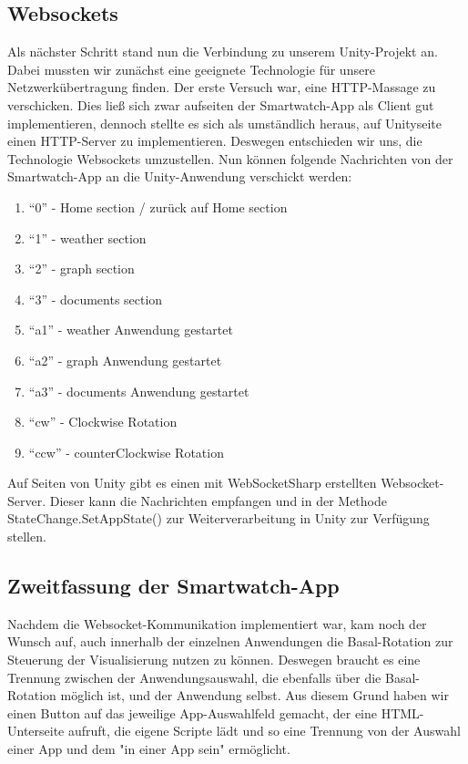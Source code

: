 \documentclass[12pt, a4paper]{article}
\begin{document}
\subsection{Websockets}

Als nächster Schritt stand nun die Verbindung zu unserem Unity-Projekt an. Dabei mussten wir zunächst eine geeignete Technologie für unsere Netzwerkübertragung finden. Der erste Versuch war, eine HTTP-Massage zu verschicken. Dies ließ sich zwar aufseiten der Smartwatch-App als Client gut implementieren, dennoch stellte es sich als umständlich heraus, auf Unityseite einen HTTP-Server zu implementieren. Deswegen entschieden wir uns, die Technologie Websockets umzustellen. Nun können folgende Nachrichten von der Smartwatch-App an die Unity-Anwendung verschickt werden: 

\begin{enumerate}
	\item{“0” - Home section / zurück auf Home section}	
	\item{“1” - weather section}
	\item{“2” - graph section}
	\item{“3” - documents section}
	\item{“a1” - weather Anwendung gestartet}
	\item{“a2” - graph Anwendung gestartet}
	\item{“a3” - documents Anwendung gestartet}
	\item{“cw” - Clockwise Rotation}
	\item{“ccw” - counterClockwise Rotation}
\end{enumerate}

Auf Seiten von Unity gibt es einen mit WebSocketSharp erstellten Websocket-Server. Dieser kann die Nachrichten empfangen und in der Methode StateChange.SetAppState() zur Weiterverarbeitung in Unity zur Verfügung stellen. 

\subsection{Zweitfassung der Smartwatch-App}

Nachdem die Websocket-Kommunikation implementiert war, kam noch der Wunsch auf, auch innerhalb der einzelnen Anwendungen die Basal-Rotation zur Steuerung der Visualisierung nutzen zu können. Deswegen braucht es eine Trennung zwischen der Anwendungsauswahl, die ebenfalls über die Basal-Rotation möglich ist, und der Anwendung selbst. Aus diesem Grund haben wir einen Button auf das jeweilige App-Auswahlfeld gemacht, der eine HTML-Unterseite aufruft, die eigene Scripte lädt und so eine Trennung von der Auswahl einer App und dem "in einer App sein" ermöglicht. 
\end{document}
